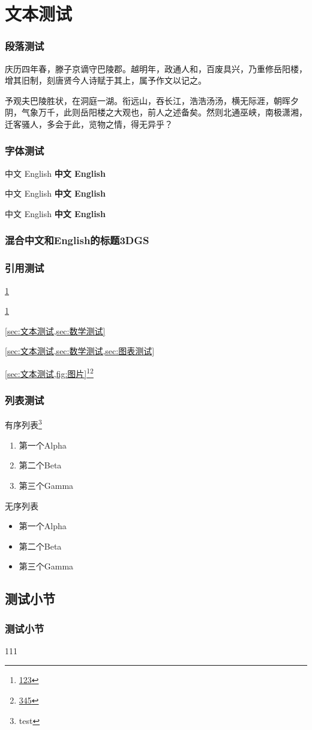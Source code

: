 \section{文本测试}\label{sec:文本测试}

\begin{frame}
    \frametitle{段落测试}
    庆历四年春，滕子京谪守巴陵郡。越明年，政通人和，百废具兴，乃重修岳阳楼，增其旧制，刻唐贤今人诗赋于其上，属予作文以记之。

    予观夫巴陵胜状，在洞庭一湖。衔远山，吞长江，浩浩汤汤，横无际涯，朝晖夕阴，气象万千，此则岳阳楼之大观也，前人之述备矣。然则北通巫峡，南极潇湘，迁客骚人，多会于此，览物之情，得无异乎？
\end{frame}

\begin{frame}
    \frametitle{字体测试}
    {\rmfamily 中文 English \bfseries 中文 English} 

    {\sffamily 中文 English \bfseries 中文 English} 

    {\ttfamily 中文 English \bfseries 中文 English} 
\end{frame}

\begin{frame}
    \frametitle{混合中文和English的标题3DGS}
\end{frame}

\begin{frame}
    \frametitle{引用测试}
    \ref{sec:文本测试}

    \cref{sec:文本测试}

    \cref{sec:文本测试,sec:数学测试}

    \cref{sec:文本测试,sec:数学测试,sec:图表测试}

    \cref{sec:文本测试,fig:图片}\footnote{\url{123}}\footnote{\url{345}}
\end{frame}

\begin{frame}
    \frametitle{列表测试}
    有序列表\footnote{test}
    \begin{enumerate}
        \item 第一个Alpha
        \item 第二个Beta
        \item 第三个Gamma
    \end{enumerate}
    无序列表
    \begin{itemize}
        \item 第一个Alpha
        \item 第二个Beta
        \item 第三个Gamma
    \end{itemize}
\end{frame}

\subsection{测试小节}

\begin{frame}
    \frametitle{测试小节}
    111
\end{frame}